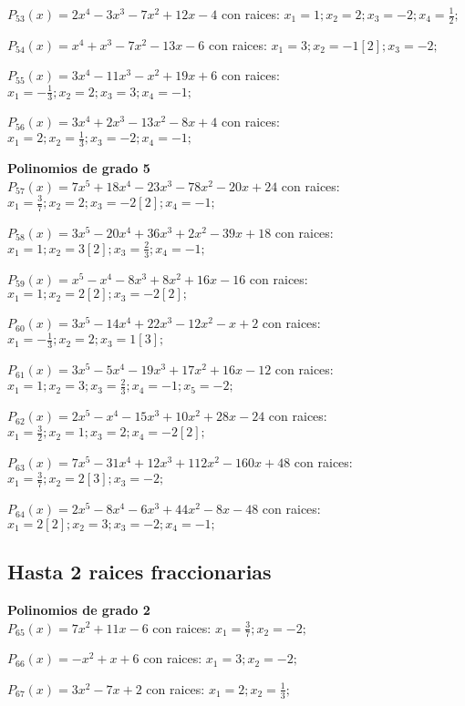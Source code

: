 \subitem $P_{53}(x) = 2x^4 - 3x^3 - 7x^2 + 12x - 4$ con raices: $x_1 = 1 ; x_2 = 2 ; x_3 = -2 ; x_4 = \frac{1}{2} ;  $

\subitem $P_{54}(x) = x^4 + x^3 - 7x^2 - 13x - 6$ con raices: $x_1 = 3 ; x_2 = -1[2] ; x_3 = -2 ;  $

\subitem $P_{55}(x) = 3x^4 - 11x^3 - x^2 + 19x + 6$ con raices: $x_1 = -\frac{1}{3} ; x_2 = 2 ; x_3 = 3 ; x_4 = -1 ;  $

\subitem $P_{56}(x) = 3x^4 + 2x^3 - 13x^2 - 8x + 4$ con raices: $x_1 = 2 ; x_2 = \frac{1}{3} ; x_3 = -2 ; x_4 = -1 ;  $

\textbf{Polinomios de grado 5\\} 
\subitem $P_{57}(x) = 7x^5 + 18x^4 - 23x^3 - 78x^2 - 20x + 24$ con raices: $x_1 = \frac{3}{7} ; x_2 = 2 ; x_3 = -2[2] ; x_4 = -1 ;  $

\subitem $P_{58}(x) = 3x^5 - 20x^4 + 36x^3 + 2x^2 - 39x + 18$ con raices: $x_1 = 1 ; x_2 = 3[2] ; x_3 = \frac{2}{3} ; x_4 = -1 ;  $

\subitem $P_{59}(x) = x^5 - x^4 - 8x^3 + 8x^2 + 16x - 16$ con raices: $x_1 = 1 ; x_2 = 2[2] ; x_3 = -2[2] ;  $

\subitem $P_{60}(x) = 3x^5 - 14x^4 + 22x^3 - 12x^2 - x + 2$ con raices: $x_1 = -\frac{1}{3} ; x_2 = 2 ; x_3 = 1[3] ;  $

\subitem $P_{61}(x) = 3x^5 - 5x^4 - 19x^3 + 17x^2 + 16x - 12$ con raices: $x_1 = 1 ; x_2 = 3 ; x_3 = \frac{2}{3} ; x_4 = -1 ; x_5 = -2 ;  $

\subitem $P_{62}(x) = 2x^5 - x^4 - 15x^3 + 10x^2 + 28x - 24$ con raices: $x_1 = \frac{3}{2} ; x_2 = 1 ; x_3 = 2 ; x_4 = -2[2] ;  $

\subitem $P_{63}(x) = 7x^5 - 31x^4 + 12x^3 + 112x^2 - 160x + 48$ con raices: $x_1 = \frac{3}{7} ; x_2 = 2[3] ; x_3 = -2 ;  $

\subitem $P_{64}(x) = 2x^5 - 8x^4 - 6x^3 + 44x^2 - 8x - 48$ con raices: $x_1 = 2[2] ; x_2 = 3 ; x_3 = -2 ; x_4 = -1 ;  $

\subsection{Hasta 2 raices fraccionarias}
\textbf{Polinomios de grado 2\\} 
\subitem $P_{65}(x) = 7x^2 + 11x - 6$ con raices: $x_1 = \frac{3}{7} ; x_2 = -2 ;  $

\subitem $P_{66}(x) = -x^2 + x + 6$ con raices: $x_1 = 3 ; x_2 = -2 ;  $

\subitem $P_{67}(x) = 3x^2 - 7x + 2$ con raices: $x_1 = 2 ; x_2 = \frac{1}{3} ;  $


